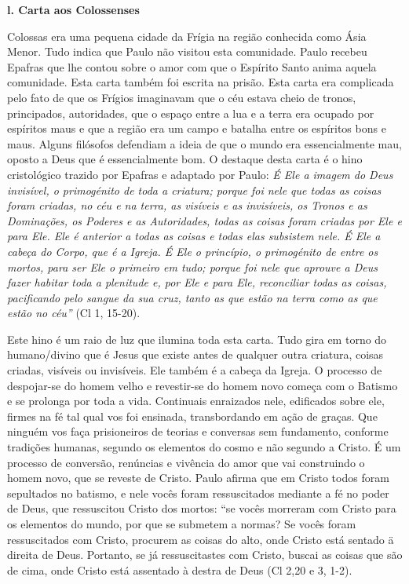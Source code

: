 \documentclass[
]{book}
\begin{document}
\textbf{l. Carta aos Colossenses}

Colossas era uma pequena cidade da Frígia na região conhecida como Ásia Menor. Tudo indica que Paulo não visitou esta comunidade. Paulo recebeu Epafras que lhe contou sobre o amor com que o Espírito Santo anima aquela comunidade. Esta carta também foi escrita na prisão. Esta carta era complicada pelo fato de que os Frígios imaginavam que o céu estava cheio de tronos, principados, autoridades, que o espaço entre a lua e a terra era ocupado por espíritos maus e que a região era um campo e batalha entre os espíritos bons e maus. Alguns filósofos defendiam a ideia de que o mundo era essencialmente mau, oposto a Deus que é essencialmente bom. O destaque desta carta é o hino cristológico trazido por Epafras e adaptado por Paulo: \emph{É Ele a imagem do Deus invisível, o primogénito de toda a criatura; porque foi nele que todas as coisas foram criadas, no céu e na terra, as visíveis e as invisíveis, os Tronos e as Dominações, os Poderes e as Autoridades, todas as coisas foram criadas por Ele e para Ele. Ele é anterior a todas as coisas e todas elas subsistem nele. É Ele a cabeça do Corpo, que é a Igreja. É Ele o princípio, o primogénito de entre os mortos, para ser Ele o primeiro em tudo; porque foi nele que aprouve a Deus fazer habitar toda a plenitude e, por Ele e para Ele, reconciliar todas as coisas, pacificando pelo sangue da sua cruz, tanto as que estão na terra como as que estão no céu''} (Cl 1, 15-20).

Este hino é um raio de luz que ilumina toda esta carta. Tudo gira em torno do humano/divino que é Jesus que existe antes de qualquer outra criatura, coisas criadas, visíveis ou invisíveis. Ele também é a cabeça da Igreja. O processo de despojar-se do homem velho e revestir-se do homem novo começa com o Batismo e se prolonga por toda a vida. Continuais enraizados nele, edificados sobre ele, firmes na fé tal qual vos foi ensinada, transbordando em ação de graças. Que ninguém vos faça prisioneiros de teorias e conversas sem fundamento, conforme tradições humanas, segundo os elementos do cosmo e não segundo a Cristo. É um processo de conversão, renúncias e vivência do amor que vai construindo o homem novo, que se reveste de Cristo. Paulo afirma que em Cristo todos foram sepultados no batismo, e nele vocês foram ressuscitados mediante a fé no poder de Deus, que ressuscitou Cristo dos mortos: ``se vocês morreram com Cristo para os elementos do mundo, por que se submetem a normas? Se vocês foram ressuscitados com Cristo, procurem as coisas do alto, onde Cristo está sentado ä direita de Deus. Portanto, se já ressuscitastes com Cristo, buscai as coisas que são de cima, onde Cristo está assentado à destra de Deus (Cl 2,20 e 3, 1-2).
\end{document}
